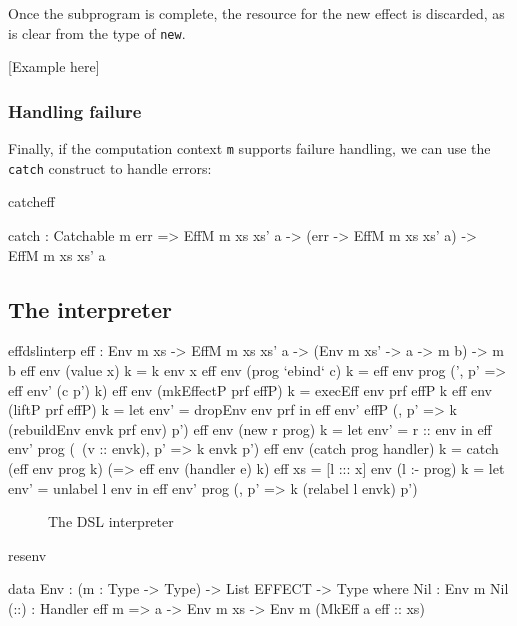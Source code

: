 \noindent
Once the subprogram is complete, the resource for the new effect is discarded,
as is clear from the type of \texttt{new}.

[Example here]

\subsubsection{Handling failure}

Finally, if the computation context \texttt{m} supports failure handling,
we can use the \texttt{catch} construct to handle errors:

\begin{SaveVerbatim}{catcheff}

catch : Catchable m err =>
        EffM m xs xs' a -> (err -> EffM m xs xs' a) ->
        EffM m xs xs' a

\end{SaveVerbatim}


\subsection{The \Eff{} interpreter}

\begin{SaveVerbatim}{effdslinterp}
eff : Env m xs -> EffM m xs xs' a -> (Env m xs' -> a -> m b) -> m b
eff env (value x) k = k env x
eff env (prog `ebind` c) k = eff env prog (\env', p' => eff env' (c p') k)
eff env (mkEffectP prf effP) k = execEff env prf effP k
eff env (liftP prf effP) k = let env' = dropEnv env prf in 
                                 eff env' effP (\envk, p' => k (rebuildEnv envk prf env) p')
eff env (new r prog) k = let env' = r :: env in 
                             eff env' prog (\ (v :: envk), p' => k envk p')
eff env (catch prog handler) k = catch (eff env prog k)
                                       (\e => eff env (handler e) k)
eff {xs = [l ::: x]} env (l :- prog) k = let env' = unlabel {l} env in
                                             eff env' prog (\envk, p' => k (relabel l envk) p')
\end{SaveVerbatim}

\begin{figure*}[t]
\begin{center}
\end{center}
\caption{The \Eff{} DSL interpreter}
\label{effdslimp}
\end{figure*}


\begin{SaveVerbatim}{resenv}

data Env  : (m : Type -> Type) -> 
            List EFFECT -> Type where
     Nil  : Env m Nil
     (::) : Handler eff m => 
            a -> Env m xs -> Env m (MkEff a eff :: xs)

\end{SaveVerbatim}
\label{sect:envdef}

